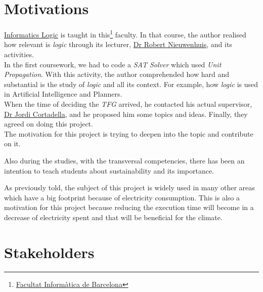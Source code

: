 

\section{Motivations}

\href{https://www.fib.upc.edu/en/studies/bachelors-degrees/bachelor-degree-informatics-engineering/curriculum/syllabus/LI}{Informatics Logic} is taught in this\footnote{\href{https://www.fib.upc.edu/en/}{Facultat Informàtica de Barcelona}} faculty. In that course, the author realised how relevant is \emph{logic} through its lecturer, \href{http://www.lsi.upc.es/~roberto/}{Dr Robert Nieuwenhuis}, and its activities. \\

In the first coursework, we had to code a \emph{SAT Solver} which used \emph{Unit Propagation}.
With this activity, the author comprehended how hard and substantial is the study of \emph{logic} and all its context. For example, how \emph{logic} is used in Artificial Intelligence and Planners.\\

When the time of deciding the \emph{TFG} arrived, he contacted his actual supervisor, \href{https://www.cs.upc.edu/~jordicf/}{Dr Jordi Cortadella}, and he proposed him some topics and ideas. Finally, they agreed on doing this project. \\

The motivation for this project is trying to deepen into the topic and contribute on it.

Also during the studies, with the transversal competencies, there has been an intention to teach students about sustainability and its importance. %

As previously told, the subject of this project is widely used in many other areas which have a big footprint because of electricity consumption. This is also a motivation for this project because reducing the execution time will become in a decrease of electricity spent and that will be beneficial for the climate.  

\section{Stakeholders}

